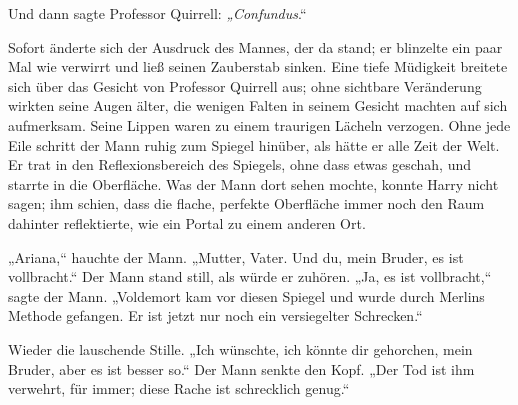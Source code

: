 Und dann sagte Professor Quirrell: \emph{„Confundus}.“

Sofort änderte sich der Ausdruck des Mannes, der da stand; er blinzelte ein paar Mal wie verwirrt und ließ seinen Zauberstab sinken.
Eine tiefe Müdigkeit breitete sich über das Gesicht von Professor Quirrell aus; ohne sichtbare Veränderung wirkten seine Augen älter, die wenigen Falten in seinem Gesicht machten auf sich aufmerksam. Seine Lippen waren zu einem traurigen Lächeln verzogen. Ohne jede Eile schritt der Mann ruhig zum Spiegel hinüber, als hätte er alle Zeit der Welt. Er trat in den Reflexionsbereich des Spiegels, ohne dass etwas geschah, und starrte in die Oberfläche. Was der Mann dort sehen mochte, konnte Harry nicht sagen; ihm schien, dass die flache, perfekte Oberfläche immer noch den Raum dahinter reflektierte, wie ein Portal zu einem anderen Ort.

„Ariana,“ hauchte der Mann. „Mutter, Vater. Und du, mein Bruder, es ist vollbracht.“
Der Mann stand still, als würde er zuhören. „Ja, es ist vollbracht,“ sagte der Mann. „Voldemort kam vor diesen Spiegel und wurde durch Merlins Methode gefangen. Er ist jetzt nur noch ein versiegelter Schrecken.“

Wieder die lauschende Stille.
„Ich wünschte, ich könnte dir gehorchen, mein Bruder, aber es ist besser so.“
Der Mann senkte den Kopf.
„Der Tod ist ihm verwehrt, für immer; diese Rache ist schrecklich genug.“

